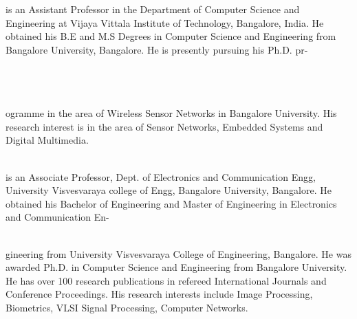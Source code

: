 \documentclass[fleqn,twoside]{article}
\begin{document}
\begin{minipage}[b][1in][c]{1.8in}
{ is an Assistant Professor in the Department of Computer Science and Engineering at Vijaya Vittala Institute of Technology, Bangalore, India. He obtained his B.E and M.S Degrees in Computer Science and Engineering from Bangalore University, Bangalore. He is presently pursuing his Ph.D. pr-}\\\\\\
\end{minipage}\\
ogramme in the area of Wireless Sensor Networks in Bangalore University. His research interest is in the area of Sensor Networks, Embedded Systems and Digital Multimedia. \\\\

\begin{minipage}[b][1in][c]{1.8in}
{ is an Associate Professor, Dept. of Electronics and Communication Engg, University Visvesvaraya college of Engg, Bangalore University, Bangalore. He     obtained his Bachelor of Engineering and Master of Engineering in Electronics and Communication  En- }\\\\
\end{minipage}
gineering from University   Visvesvaraya  College     of Engineering, Bangalore. He was awarded
Ph.D. in Computer Science and Engineering from Bangalore
University. He has over 100 research publications in refereed
International Journals and Conference Proceedings. His research
interests include Image Processing, Biometrics, VLSI      Signal
Processing, Computer Networks.
 \\\\

 
\end{document}

